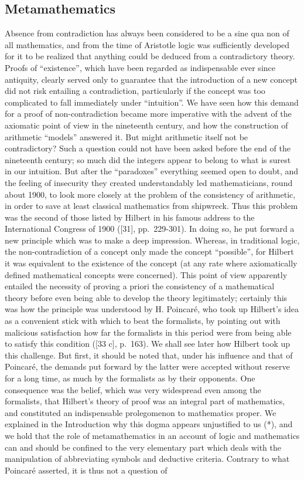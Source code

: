 \subsection*{Metamathematics}

Absence from contradiction has always been considered to be a sine qua non of all mathematics, and from the time of Aristotle logic was sufficiently developed for it to be realized that anything could be deduced from a contradictory theory. Proofs of ``existence'', which have been regarded as indispensable ever since antiquity, clearly served only to guarantee that the introduction of a new concept did not risk entailing a contradiction, particularly if the concept was too complicated to fall immediately under ``intuition''. We have seen how this demand for a proof of non-contradiction became more imperative with the advent of the axiomatic point of view in the nineteenth century, and how the construction of arithmetic ``models'' answered it. But might arithmetic itself not be contradictory? Such a question could not have been asked before the end of the nineteenth century; so much did the integers appear to belong to what is surest in our intuition. But after the ``paradoxes'' everything seemed open to doubt, and the feeling of insecurity they created understandably led mathematicians, round about 1900, to look more closely at the problem of the consistency of arithmetic, in order to save at least classical mathematics from shipwreck. Thus this problem was the second of those listed by Hilbert in his famous address to the International Congress of 1900 ({[}31{]}, pp.~229-301). In doing so, he put forward a new principle which was to make a deep impression. Whereas, in traditional logic, the non-contradiction of a concept only made the concept ``possible'', for Hilbert it was equivalent to the existence of the concept (at any rate where axiomatically defined mathematical concepts were concerned). This point of view apparently entailed the necessity of proving a priori the consistency of a mathematical theory before even being able to develop the theory legitimately; certainly this was how the principle was understood by H. Poincaré, who took up Hilbert's idea as a convenient stick with which to beat the formalists, by pointing out with malicious satisfaction how far the formalists in this period were from being able to satisfy this condition ({[}33 c{]}, p.~163). We shall see later how Hilbert took up this challenge. But first, it should be noted that, under his influence and that of Poincaré, the demands put forward by the latter were accepted without reserve for a long time, as much by the formalists as by their opponents. One consequence was the belief, which was very widespread even among the formalists, that Hilbert's theory of proof was an integral part of mathematics, and constituted an indispensable prolegomenon to mathematics proper. We explained in the Introduction why this dogma appears unjustified to us (*), and we hold that the role of metamathematics in an account of logic and mathematics can and should be confined to the very elementary part which deals with the manipulation of abbreviating symbols and deductive criteria. Contrary to what Poincaré asserted, it is thus not a question of 
